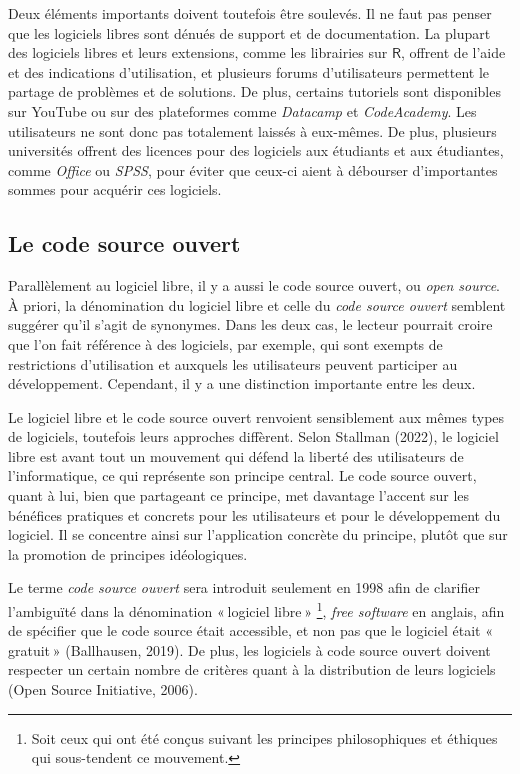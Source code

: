 \documentclass[
  letterpaper,
  DIV=11,
  numbers=noendperiod,
  oneside]{scrreprt}
\begin{document}
Deux éléments importants doivent toutefois être soulevés. Il ne faut pas
penser que les logiciels libres sont dénués de support et de
documentation. La plupart des logiciels libres et leurs extensions,
comme les librairies sur \(\textsf{R}\), offrent de l'aide et des
indications d'utilisation, et plusieurs forums d'utilisateurs permettent
le partage de problèmes et de solutions. De plus, certains tutoriels
sont disponibles sur YouTube ou sur des plateformes comme
\emph{Datacamp} et \emph{CodeAcademy}. Les utilisateurs ne sont donc pas
totalement laissés à eux-mêmes. De plus, plusieurs universités offrent
des licences pour des logiciels aux étudiants et aux étudiantes, comme
\emph{Office} ou \emph{SPSS}, pour éviter que ceux-ci aient à débourser
d'importantes sommes pour acquérir ces logiciels.

\hypertarget{le-code-source-ouvert}{%
\subsection{Le code source ouvert}\label{le-code-source-ouvert}}

Parallèlement au logiciel libre, il y a aussi le code source ouvert, ou
\emph{open source}. À priori, la dénomination du logiciel libre et celle
du \emph{code source ouvert} semblent suggérer qu'il s'agit de
synonymes. Dans les deux cas, le lecteur pourrait croire que l'on fait
référence à des logiciels, par exemple, qui sont exempts de restrictions
d'utilisation et auxquels les utilisateurs peuvent participer au
développement. Cependant, il y a une distinction importante entre les
deux.

Le logiciel libre et le code source ouvert renvoient sensiblement aux
mêmes types de logiciels, toutefois leurs approches diffèrent. Selon
Stallman (2022), le logiciel libre est avant tout un mouvement qui
défend la liberté des utilisateurs de l'informatique, ce qui représente
son principe central. Le code source ouvert, quant à lui, bien que
partageant ce principe, met davantage l'accent sur les bénéfices
pratiques et concrets pour les utilisateurs et pour le développement du
logiciel. Il se concentre ainsi sur l'application concrète du principe,
plutôt que sur la promotion de principes idéologiques.

Le terme \emph{code source ouvert} sera introduit seulement en 1998 afin
de clarifier l'ambiguïté dans la dénomination « logiciel libre »
\footnote{Soit ceux qui ont été conçus suivant les principes
  philosophiques et éthiques qui sous-tendent ce mouvement.}, \emph{free
software} en anglais, afin de spécifier que le code source était
accessible, et non pas que le logiciel était « gratuit » (Ballhausen,
2019). De plus, les logiciels à code source ouvert doivent respecter un
certain nombre de critères quant à la distribution de leurs logiciels
(Open Source Initiative, 2006).
\end{document}

